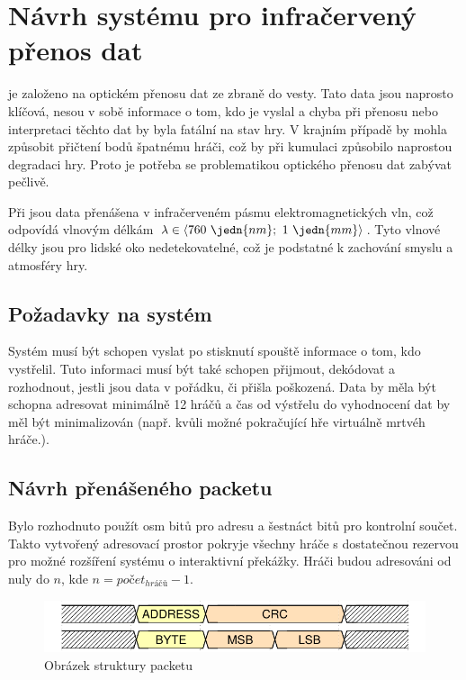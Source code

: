 \chapter{Návrh systému pro infračervený přenos dat}
 je založeno na optickém přenosu dat ze zbraně do vesty. Tato data jsou naprosto klíčová, nesou v sobě informace o tom, kdo je vyslal a chyba při přenosu nebo interpretaci těchto dat by byla fatální na stav hry. V krajním případě by mohla způsobit přičtení bodů špatnému hráči, což by při kumulaci způsobilo naprostou degradaci hry. Proto je potřeba se problematikou optického přenosu dat zabývat pečlivě.

Při  jsou data přenášena v infračerveném pásmu elektromagnetických vln, což odpovídá vlnovým délkám $\lambda \in \langle 760~\jedn{nm};~1~\jedn{mm}\rangle$. Tyto vlnové délky jsou pro lidské oko nedetekovatelné, což je podstatné k zachování smyslu a atmosféry hry.

\section{Požadavky na systém}
Systém musí být schopen vyslat po stisknutí spouště informace o tom, kdo vystřelil. Tuto informaci musí být také schopen přijmout, dekódovat a rozhodnout, jestli jsou data v pořádku, či přišla poškozená. Data by měla být schopna adresovat minimálně 12 hráčů a čas od výstřelu do vyhodnocení dat by měl být minimalizován (např. kvůli možné pokračující hře virtuálně mrtvéh hráče.).

\section{Návrh přenášeného packetu}
Bylo rozhodnuto použít osm bitů pro adresu a šestnáct bitů pro kontrolní součet. Takto vytvořený adresovací prostor pokryje všechny hráče s dostatečnou rezervou pro možné rozšíření systému o interaktivní překážky. Hráči budou adresováni od nuly do $n$, kde $n = počet _{hráčů} - 1$.

\begin{figure}[H]
    \begin{center}
        \includegraphics[width=\textwidth]{img/ir-packet}
    \end{center}
    \caption{Obrázek struktury packetu}
\end{figure}

